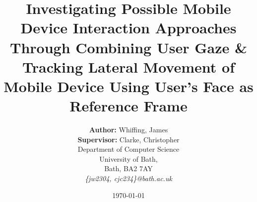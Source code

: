 
\thispagestyle{empty} %

\title{Investigating Possible Mobile Device Interaction Approaches Through Combining User Gaze \& Tracking Lateral Movement of Mobile Device Using User's Face as Reference Frame}

\renewcommand\maketitlehookb{\centering \Large CM50175 - Project Proposal}
\date{\today}
\author{
    \textbf{Author:} Whiffing, James\\
    \textbf{Supervisor:} Clarke, Christopher\\
    Department of Computer Science\\
    University of Bath,\\
    Bath, BA2 7AY \\
    \textit{\{jw2304, cjc234\}@bath.ac.uk}
}

\maketitle

\clearpage
\restoregeometry
\newpage

\setcounter{page}{0}
\pagestyle{fancy}


\tableofcontents
\clearpage
\newpage


\setcounter{page}{1}

